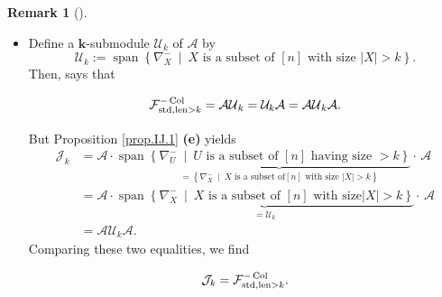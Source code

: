 \documentclass[numbers=enddot,12pt,final,onecolumn,notitlepage]{scrartcl}%
\numberwithin{exer}{subsection}
\theoremstyle{definition}
\newtheorem{remk}[theo]{Remark}
\newenvironment{remark}[1][]
{\begin{remk}[#1]\begin{leftbar}}
{\end{leftbar}\end{remk}}
\newcommand{\MurpF}{\vphantom{\int_g^g}\mathcal{F}}
\begin{document}
\begin{remark}
\begin{itemize}
\item Define a $\mathbf{k}$-submodule $\mathcal{U}_{k}$ of $\mathcal{A}$ by%
\[
\mathcal{U}_{k}:=\operatorname*{span}\left\{  \nabla_{X}^{-}\ \mid\ X\text{ is
a subset of }\left[  n\right]  \text{ with size }\left\vert X\right\vert
>k\right\}  .
\]
Then, \cite[Proposition 6.8.53]{sga} says that
\[
\MurpF_{\operatorname*{std},\operatorname*{len}>k}^{-\operatorname*{Col}%
}=\mathcal{AU}_{k}=\mathcal{U}_{k}\mathcal{A}=\mathcal{AU}_{k}\mathcal{A}.
\]
But Proposition \ref{prop.IJ.1} \textbf{(e)} yields%
\begin{align*}
\mathcal{J}_{k}  &  =\mathcal{A}\cdot\operatorname*{span}\underbrace{\left\{
\nabla_{U}^{-}\ \mid\ U\text{ is a subset of }\left[  n\right]  \text{ having
size }>k\right\}  }_{=\left\{  \nabla_{X}^{-}\ \mid\ X\text{ is a subset of
}\left[  n\right]  \text{ with size }\left\vert X\right\vert >k\right\}
}\cdot\,\mathcal{A}\\
&  =\mathcal{A}\cdot\underbrace{\operatorname*{span}\left\{  \nabla_{X}%
^{-}\ \mid\ X\text{ is a subset of }\left[  n\right]  \text{ with size
}\left\vert X\right\vert >k\right\}  }_{=\mathcal{U}_{k}}\cdot\,\mathcal{A}\\
&  =\mathcal{AU}_{k}\mathcal{A}.
\end{align*}
Comparing these two equalities, we find%
\begin{equation}
\mathcal{J}_{k}=\MurpF_{\operatorname*{std},\operatorname*{len}>k}%
^{-\operatorname*{Col}}. \label{eq.rmk.IJ=murphy.J}%
\end{equation}

\end{itemize}


\end{remark}
\end{document}
